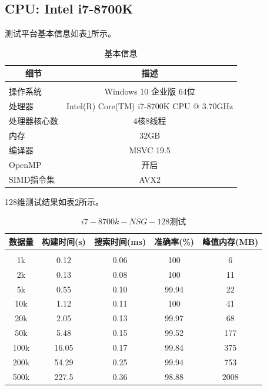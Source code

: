 \documentclass[a4paper, 11pt, UTF8]{ctexart}%
\begin{document}
\subsection{CPU: Intel i7-8700K}
测试平台基本信息如表\ref{tab:basic-info-i7-8700k}所示。
\begin{table}[H]
\caption{基本信息}
\label{tab:basic-info-i7-8700k}
\begin{center}
\begin{tabular}{lc}
\multicolumn{1}{c}{\bf 细节}  &\multicolumn{1}{c}{\bf 描述}
\\ \hline \\
操作系统         &Windows 10 企业版 64位 \\
处理器           &Intel(R) Core(TM) i7-8700K CPU @ 3.70GHz \\
处理器核心数     &4核8线程 \\
内存             &32GB \\
编译器           &MSVC 19.5 \\
OpenMP           &开启 \\
SIMD指令集       &AVX2 \\
\end{tabular}
\end{center}
\end{table}

128维测试结果如表\ref{tab:i7-8700k-NSG-128}所示。
\begin{table}[H]
\caption{$i7-8700k-NSG-128$测试}
\label{tab:i7-8700k-NSG-128}
\begin{center}
\begin{tabular}{ccccc}
\multicolumn{1}{c}{\bf 数据量}  &\multicolumn{1}{c}{\bf 构建时间(s)}  &\multicolumn{1}{c}{\bf 搜索时间(ms)}  &\multicolumn{1}{c}{\bf 准确率(\%)}  &\multicolumn{1}{c}{\bf 峰值内存(MB)}
\\ \hline \\
1k & 0.12 & 0.06 & 100 & 6\\
2k & 0.13 & 0.08 & 100 & 11\\
5k & 0.55 & 0.10 & 99.94 & 22\\
10k & 1.12 & 0.11 & 100 & 41\\
20k & 2.05 & 0.13 & 99.97 & 68\\
50k & 5.48 & 0.15 & 99.52 & 177\\
100k & 16.05 & 0.17 & 99.84 & 375\\
200k & 54.29 & 0.25 & 99.94 & 753\\
500k & 227.5 & 0.36 & 98.88 & 2008\\
\end{tabular}
\end{center}
\end{table}
\end{document}
